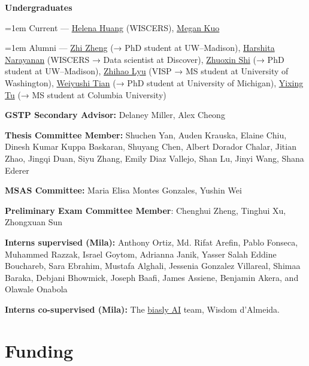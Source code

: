 \documentclass[letterpaper]{article}
\renewenvironment{itemize}{
  \begin{list}{}{
    \setlength{\leftmargin}{1.5em}
  }
}{
  \end{list}
}
\begin{document}
\begin{itemize}
    \item \textbf{Undergraduates}\\
    {\hangindent=1em \noindent\hspace*{1em}Current — \href{https://www.qinghuang.blog/}{Helena Huang} (WISCERS), \href{https://www.linkedin.com/in/megan-kuo123}{Megan Kuo}\par}
    \vspace{0.3ex}
    {\hangindent=1em \noindent\hspace*{1em}Alumni —
    \href{https://pages.cs.wisc.edu/~zzheng/}{Zhi Zheng} (→ PhD student at UW–Madison),
    \href{https://www.linkedin.com/in/harshita-narayanan}{Harshita Narayanan} (WISCERS → Data scientist at Discover),
    \href{https://smith.chem.wisc.edu/staff/shi-zhouxin/}{Zhuoxin Shi} (→ PhD student at UW–Madison),
    \href{https://www.linkedin.com/in/zhihaolyu}{Zhihao Lyu} (VISP → MS student at University of Washington),
    \href{https://surveydatascience.isr.umich.edu/students/weiyushi-tian/}{Weiyushi Tian} (→ PhD student at University of Michigan),
    \href{https://www.linkedin.com/in/yixing-tu}{Yixing Tu} (→ MS student at Columbia University)\par}

\item \textbf{GSTP Secondary Advisor:} Delaney Miller, Alex Cheong
\item \textbf{Thesis Committee Member:} Shuchen Yan, Auden Krauska, Elaine Chiu,
Dinesh Kumar Kuppa Baskaran, Shuyang Chen, Albert Dorador Chalar, Jitian Zhao,
Jingqi Duan, Siyu Zhang, Emily Diaz Vallejo, Shan Lu, Jinyi Wang, Shana Ederer
\item \textbf{MSAS Committee:} Maria Elisa Montes Gonzales, Yushin Wei
\item \textbf{Preliminary Exam Committee Member}: Chenghui Zheng, Tinghui Xu, Zhongxuan Sun
\item \textbf{Interns supervised (Mila):} Anthony Ortiz, Md. Rifat Arefin, Pablo
Fonseca, Muhammed Razzak, Israel Goytom, Adrianna Janik, Yasser Salah Eddine
Bouchareb, Sara Ebrahim, Mustafa Alghali, Jessenia Gonzalez Villareal, Shimaa
Baraka, Debjani Bhowmick, Joseph Baafi, James Assiene, Benjamin Akera, and
Olawale Onabola
\item \textbf{Interns co-supervised (Mila):} The
\href{https://sites.google.com/view/biaslyai/home}{biasly AI} team, Wisdom
d'Almeida.
\end{itemize}

\section*{Funding}
\end{document}
